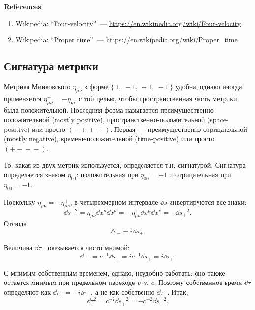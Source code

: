 \documentclass[\docroot/reports/draft/report.tex]{subfiles}
\begin{document}
    \vspace{1cm}

    \textbf{\Large{References}}:
    \begin{enumerate}
        \item Wikipedia: \enquote{Four-velocity}~--- \url{https://en.wikipedia.org/wiki/Four-velocity}
        \item Wikipedia: \enquote{Proper time}~--- \url{https://en.wikipedia.org/wiki/Proper_time}
    \end{enumerate}

\subsection{Сигнатура метрики}

    Метрика Минковского $\eta_{\mu\nu}$ в форме $\{\ 1,\ -1,\ -1,\ -1\ \}$ удобна, однако иногда применяется $\eta^-_{\mu\nu} = -\eta_{\mu\nu}$ с той целью, чтобы пространственная часть метрики была положительной. Последняя форма называется преимущественно-положительной (mostly positive), пространственно-положительной (space-positive) или просто $(-{}+{}+{}+{})$. Первая~--- преимущественно-отрицательной (mostly negative), времене-положительной (time-positive) или просто $(+{}-{}-{}-{})$.

    То, какая из двух метрик используется, определяется т.н. сигнатурой. Сигнатура определяется знаком $\eta_{00}$: положительная при $\eta_{00} = +1$ и отрицательная при $\eta_{00} = -1$.

    Поскольку $\eta^-_{\mu\nu} = - \eta^+_{\mu\nu}$, в четырехмерном интервале $\dd{s}$ инвертируются все знаки:
    \begin{equation*}
        \dd{s_-}^2 = \eta^-_{\mu\nu} \dd{x^\mu} \dd{x^\nu}
                 = - \eta^+_{\mu\nu} \dd{x^\mu} \dd{x^\nu}
                 = - \dd{s_+}^2 .
    \end{equation*}
    Отсюда
    \begin{equation*}
        \dd{s_-} = i \dd{s_+} .
    \end{equation*}

    Величина $\dd{\tau_-}$ оказывается чисто мнимой:
    \begin{equation*}
        \dd{\tau_-} = c^{-1} \dd{s_-} = i c^{-1} \dd{s_+} = i \dd{\tau_+} .
    \end{equation*}

    С мнимым собственным временем, однако, неудобно работать: оно также остается мнимым при предельном переходе $v \ll c$. Поэтому собственное время $\dd{\tau}$ определяют как $\dd{\tau_+} = - i \dd{\tau_-}$, а не как собственно $\dd{\tau_-}$. Итак,
    \begin{equation*}
        \dd{\tau}^2 = c^{-2} \dd{s_+}^2 = - c^{-2} \dd{s_-}^2 .
    \end{equation*}
\end{document}
